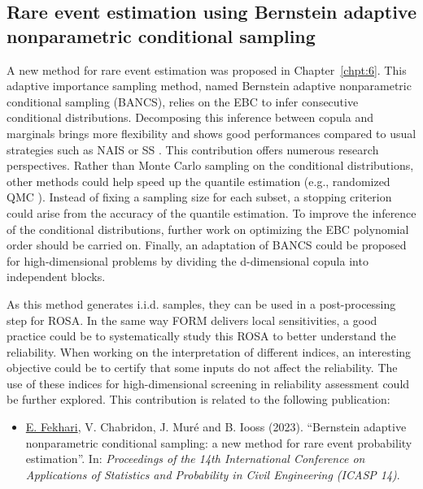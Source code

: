 \subsection*{Rare event estimation using Bernstein adaptive nonparametric conditional sampling}

A new method for rare event estimation was proposed in Chapter~\ref{chpt:6}. 
This adaptive importance sampling method, named Bernstein adaptive nonparametric conditional sampling (BANCS), relies on the EBC to infer consecutive conditional distributions. 
Decomposing this inference between copula and marginals brings more flexibility and shows good performances compared to usual strategies such as NAIS \citep{zhang_1996_NIS} or SS \citep{AuBeck2001}. 
This contribution offers numerous research perspectives. 
Rather than Monte Carlo sampling on the conditional distributions, other methods could help speed up the quantile estimation (e.g., randomized QMC \citealp{tuffin_2019}). 
Instead of fixing a sampling size for each subset, a stopping criterion could arise from the accuracy of the quantile estimation. 
To improve the inference of the conditional distributions, further work on optimizing the EBC polynomial order should be carried on. 
Finally, an adaptation of BANCS could be proposed for high-dimensional problems by dividing the d-dimensional copula into independent blocks.   

As this method generates i.i.d. samples, they can be used in a post-processing step for ROSA.
In the same way FORM delivers local sensitivities, a good practice could be to systematically study this ROSA to better understand the reliability. 
When working on the interpretation of different indices, an interesting objective could be to certify that some inputs do not affect the reliability. 
The use of these indices for high-dimensional screening in reliability assessment could be further explored. 
This contribution is related to the following publication:
\begin{itemize}
    \footnotesize
    \item[\ding{125}] \underline{E. Fekhari}, V. Chabridon, J. Mur\'{e} and B. Iooss (2023). ``Bernstein adaptive nonparametric conditional sampling: a new method for rare event probability estimation''. In: \textit{Proceedings of the 14th International Conference on Applications of Statistics and Probability in Civil Engineering (ICASP 14)}.
\end{itemize}




